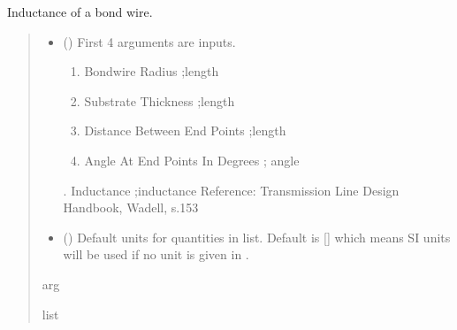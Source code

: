 \documentclass[letterpaper,10pt,english]{sphinxmanual}
\begin{document}
\begin{fulllineitems}
\label{\detokenize{components:components.L_BondWire}}
\pysigstartsignatures
{}
\pysigstopsignatures
\sphinxAtStartPar
Inductance of a bond wire.
\begin{quote}\begin{description}
\begin{itemize}
\item {} 
\sphinxAtStartPar
{} () \textendash{} 
\sphinxAtStartPar
First 4 arguments are inputs.
\begin{enumerate}
%
\item {} 
\sphinxAtStartPar
Bondwire Radius ;length

\item {} 
\sphinxAtStartPar
Substrate Thickness ;length

\item {} 
\sphinxAtStartPar
Distance Between End Points ;length

\item {} 
\sphinxAtStartPar
Angle At End Points In Degrees ; angle

\end{enumerate}

. Inductance ;inductance
Reference:  Transmission Line Design Handbook, Wadell, s.153


\item {} 
\sphinxAtStartPar
{} (\sphinxstyleliteralemphasis{\sphinxupquote{, }}) \textendash{} Default units for quantities in  list. Default is {[}{]} which means SI units will be used if no unit is given in .

\end{itemize}

\sphinxAtStartPar
arg

\sphinxAtStartPar
list

\end{description}\end{quote}

\end{fulllineitems}
\end{document}

